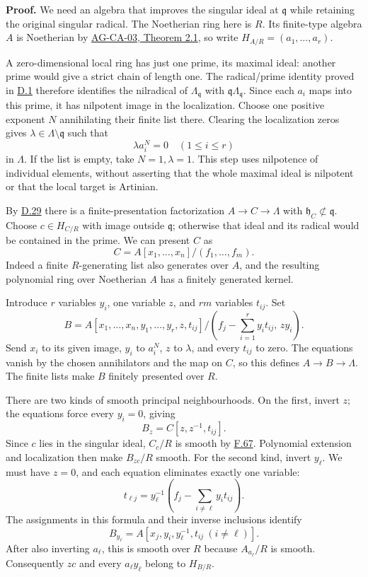 \documentclass[11pt,a4paper,openany]{report}
\begin{document}
\textbf{Proof.} We need an algebra that improves the singular ideal at \(\mathfrak q\) while retaining the original singular radical. The Noetherian ring here is \(R\). Its finite-type algebra \(A\) is Noetherian by \href{https://github.com/KokunoYumeto/open-math-courses/blob/d02d0a3669f42579db037cd44de1d113fdd770a1/docs/courses/AG-CA/src/noetherian-and-artinian-rings.md}{AG-CA-03, Theorem 2.1}, so write \(H_{A/R}=(a_1,\ldots,a_r)\).

A zero-dimensional local ring has just one prime, its maximal ideal: another prime would give a strict chain of length one. The radical/prime identity proved in \hyperref[AG-RG-S05-smoothing-definition-singular-ideal]{D.1} therefore identifies the nilradical of \(\Lambda_{\mathfrak q}\) with \(\mathfrak q\Lambda_{\mathfrak q}\). Since each \(a_i\) maps into this prime, it has nilpotent image in the localization. Choose one positive exponent \(N\) annihilating their finite list there. Clearing the localization zeros gives \(\lambda\in\Lambda\setminus\mathfrak q\) such that \[\lambda a_i^N=0\quad(1\leq i\leq r)\] in \(\Lambda\). If the list is empty, take \(N=1,\lambda=1\). This step uses nilpotence of individual elements, without asserting that the whole maximal ideal is nilpotent or that the local target is Artinian.

By \hyperref[AG-RG-S05-smoothing-lemma-delocalize-weak]{D.29} there is a finite-presentation factorization \(A\to C\to\Lambda\) with \(\mathfrak h_C\not\subset\mathfrak q\). Choose \(c\in H_{C/R}\) with image outside \(\mathfrak q\); otherwise that ideal and its radical would be contained in the prime. We can present \(C\) as \[C=A[x_1,\ldots,x_n]/(f_1,\ldots,f_m).\] Indeed a finite \(R\)-generating list also generates over \(A\), and the resulting polynomial ring over Noetherian \(A\) has a finitely generated kernel.

Introduce \(r\) variables \(y_i\), one variable \(z\), and \(rm\) variables \(t_{ij}\). Set \[B=A[x_1,\ldots,x_n,y_1,\ldots,y_r,z,t_{ij}]/
\left(f_j-\sum_{i=1}^r y_it_{ij},\,zy_i\right).\] Send \(x_i\) to its given image, \(y_i\) to \(a_i^N\), \(z\) to \(\lambda\), and every \(t_{ij}\) to zero. The equations vanish by the chosen annihilators and the map on \(C\), so this defines \(A\to B\to\Lambda\). The finite lists make \(B\) finitely presented over \(R\).

There are two kinds of smooth principal neighbourhoods. On the first, invert \(z\); the equations force every \(y_i=0\), giving \[B_z=C[z,z^{-1},t_{ij}].\] Since \(c\) lies in the singular ideal, \(C_c/R\) is smooth by \hyperref[AG-RG-S05-algebra-lemma-locally-smooth]{F.67}. Polynomial extension and localization then make \(B_{zc}/R\) smooth. For the second kind, invert \(y_\ell\). We must have \(z=0\), and each equation eliminates exactly one variable: \[t_{\ell j}=y_\ell^{-1}\left(f_j-\sum_{i\ne\ell}y_it_{ij}\right).\] The assignments in this formula and their inverse inclusions identify \[B_{y_\ell}=A[x_j,y_i,y_\ell^{-1},t_{ij}\ (i\ne\ell)].\] After also inverting \(a_\ell\), this is smooth over \(R\) because \(A_{a_\ell}/R\) is smooth. Consequently \(zc\) and every \(a_\ell y_\ell\) belong to \(H_{B/R}\).
\end{document}
